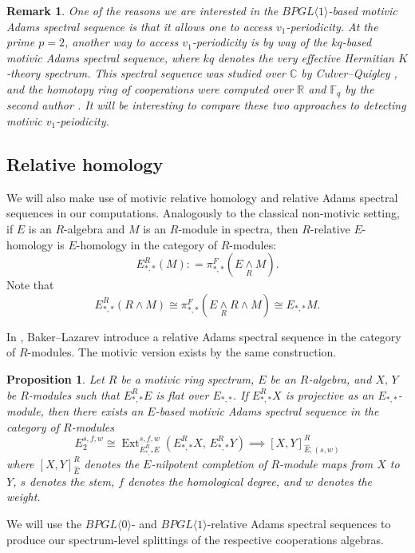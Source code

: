 \documentclass{amsart}
\newtheorem{proposition}[theorem]{Proposition}
\newtheorem{remark}[theorem]{Remark}
\theoremstyle{plain}
\numberwithin{theorem}{section}
\numberwithin{equation}{section}
\numberwithin{figure}{section}
\DeclareMathOperator{\Ext}{Ext}
\newcommand{\0}{\langle 0 \rangle }
\begin{document}
\begin{remark}
    \rm One of the reasons we are interested in the $BPGL \langle 1 \rangle$-based motivic Adams spectral sequence is that it allows one to access $v_1$-periodicity. At the prime $p=2$, another way to access $v_1$-periodicity is by way of the $kq$-based motivic Adams spectral sequence, where $kq$ denotes the very effective Hermitian $K$-theory spectrum. This spectral sequence was studied over $\mathbb{C}$ by Culver--Quigley \cite{CQ21}, and the homotopy ring of cooperations were computed over $\mathbb{R}$ and $\mathbb{F}_q$ by the second author \cite{Realkqcoop, finitekqcoop}. It will be interesting to compare these two approaches to detecting motivic $v_1$-peiodicity.
\end{remark}

\subsection{Relative homology}
\label{subsec:relative}
We will also make use of motivic relative homology and relative Adams spectral sequences in our computations. Analogously to the classical non-motivic setting, if $E$ is an $R$-algebra and $M$ is an $R$-module in spectra, then $R$-relative $E$-homology is $E$-homology in the category of $R$-modules:
\[
E^R_{*,*} (M) : = \pi^F_{*,*} (E \underset{R}{\wedge} M).
\]
Note that
\[
E^R_{*,*} (R \wedge M) \cong \pi^F_{*,*} (E \underset{R}{ \wedge } R {\wedge} M ) \cong E_{*,*} M.
\]

In \cite[Prop 2.1]{BakerLazarev01}, Baker--Lazarev introduce a relative Adams spectral sequence in the category of $R$-modules. The motivic version exists by the same construction.

\begin{proposition}
    Let $R$ be a motivic ring spectrum, $E$ be an $R$-algebra, and $X,\,Y$ be $R$-modules such that $E_{*,*}^RE$ is flat over $E_{*,*}$. If $E^R_{*,*}X$ is projective as an $E_{*,*}$-module, then there exists an $E$-based motivic Adams spectral sequence in the category of $R$-modules
    \[
    E_2^{s,f,w} \cong \Ext_{E^R_{*,*}E}^{s,f,w} (E^R_{*,*} X , \, E^R_{*,*} Y ) \implies [X , Y]_{\hat{E}, (s,w)}^{R}  
    \]
    where $[X, Y]_{\hat{E}}^R$ denotes the $E$-nilpotent completion of $R$-module maps from $X$ to $Y$, $s$ denotes the stem, $f$ denotes the homological degree, and $w$ denotes the weight. 
\end{proposition} 

We will use the $BPGL\langle 0 \rangle$- and $BPGL \langle 1 \rangle$-relative Adams spectral sequences to produce our spectrum-level splittings of the respective cooperations algebras.
\end{document}
